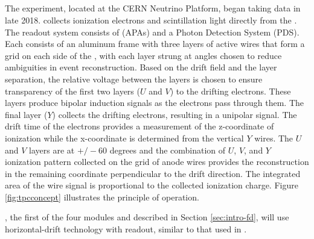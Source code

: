 \documentclass[../main-v1.tex]{subfiles}
\begin{document}
\subsection{} %
The  experiment\cite{DUNE:2021hwx}, located at the CERN Neutrino Platform, began taking data %
in late 2018.   %
collects ionization electrons and scintillation light %
directly from the . The readout system consists of  %
 (APAs) and a Photon Detection System (PDS).
Each  consists of an aluminum frame with three layers of active wires that form a grid on each side of the , with each layer strung at angles chosen to reduce ambiguities in event reconstruction. Based on the drift field and the layer separation, the relative voltage between the layers is chosen to ensure transparency of the first two layers ($U$ and $V$) to the drifting electrons. These layers produce bipolar induction signals as the electrons pass through them. The final layer ($Y$) collects the drifting electrons, resulting in a unipolar signal. The drift time of the electrons provides a measurement of the z-coordinate of ionization while the x-coordinate is determined from the vertical $Y$ wires. The $U$ and $V$ layers are at $+/- 60$ degrees and the combination of $U$, $V$, and $Y$ ionization pattern collected on the grid of anode wires provides the reconstruction in the remaining coordinate perpendicular to the drift direction. The integrated area of the wire signal is proportional to the collected ionization charge.
Figure \ref{fig:tpcconcept} illustrates the principle of operation. %

, the first of the four  modules and described in Section \ref{sec:intro-fd}, will use horizontal-drift  technology with  readout, similar to that used in . 
\end{document}
